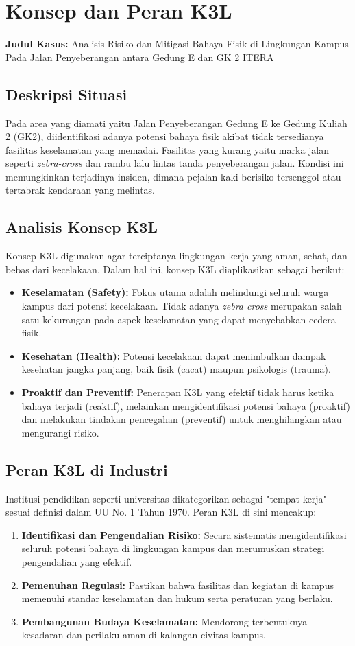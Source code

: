 \documentclass[a4paper, 12pt]{article}
\begin{document}
\section{Konsep dan Peran K3L}
\noindent\textbf{Judul Kasus:} Analisis Risiko dan Mitigasi Bahaya Fisik di Lingkungan Kampus Pada Jalan Penyeberangan antara Gedung E dan GK 2 ITERA 

\subsection{Deskripsi Situasi}
Pada area yang diamati yaitu Jalan Penyeberangan Gedung E ke Gedung Kuliah 2 (GK2), diidentifikasi adanya potensi bahaya fisik akibat tidak tersedianya
fasilitas keselamatan yang memadai. Fasilitas yang kurang yaitu marka jalan seperti \textit{zebra-cross} dan rambu lalu lintas tanda penyeberangan jalan.
Kondisi ini memungkinkan terjadinya insiden, dimana pejalan kaki berisiko tersenggol atau tertabrak kendaraan yang melintas.
\subsection{Analisis Konsep K3L}
Konsep K3L digunakan agar terciptanya lingkungan kerja yang aman, sehat, dan bebas dari kecelakaan. 
Dalam hal ini, konsep K3L diaplikasikan sebagai berikut:
\begin{itemize}
    \item \textbf{Keselamatan (Safety):} Fokus utama adalah melindungi seluruh warga kampus dari potensi kecelakaan. Tidak adanya \textit{zebra cross} merupakan 
      salah satu kekurangan pada aspek keselamatan yang dapat menyebabkan cedera fisik.
    \item \textbf{Kesehatan (Health):} Potensi kecelakaan dapat menimbulkan dampak kesehatan jangka panjang, baik fisik (cacat) maupun psikologis (trauma).
    \item \textbf{Proaktif dan Preventif:} Penerapan K3L yang efektif tidak harus ketika bahaya terjadi (reaktif), melainkan mengidentifikasi potensi bahaya (proaktif) dan 
      melakukan tindakan pencegahan (preventif) untuk menghilangkan atau mengurangi risiko.
\end{itemize}

\subsection{Peran K3L di Industri}
Institusi pendidikan seperti universitas dikategorikan sebagai "tempat kerja" sesuai definisi dalam UU No. 1 Tahun 1970. Peran K3L di sini mencakup:
\begin{enumerate}
    \item \textbf{Identifikasi dan Pengendalian Risiko:} Secara sistematis mengidentifikasi seluruh potensi bahaya di lingkungan kampus dan merumuskan strategi pengendalian yang efektif.
    \item \textbf{Pemenuhan Regulasi:} Pastikan bahwa fasilitas dan kegiatan di kampus memenuhi standar keselamatan dan hukum serta peraturan yang berlaku.
    \item \textbf{Pembangunan Budaya Keselamatan:} Mendorong terbentuknya kesadaran dan perilaku aman di kalangan civitas kampus.
\end{enumerate}
\end{document}
